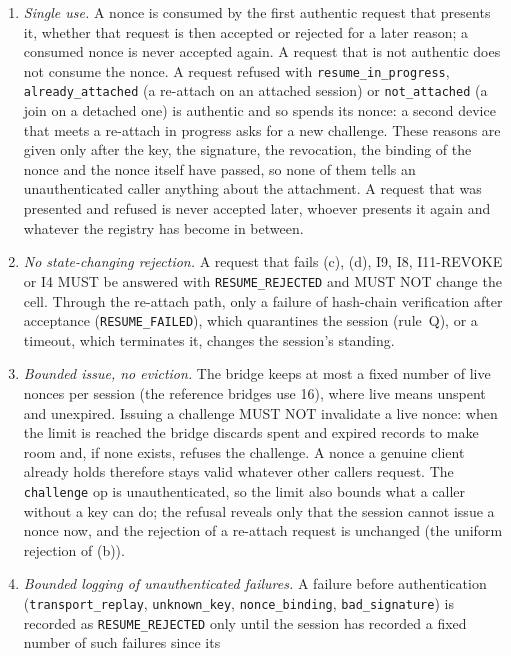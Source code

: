 \begin{invariant}
\begin{enumerate}[leftmargin=2em,label=(\alph*)]
terminated, quarantined, key-exhausted) is named only to a caller whose
signature verified; any other caller is answered \texttt{bad\_signature}.
\item \emph{Single use.} A nonce is consumed by the first authentic
request that presents it, whether that request is then accepted or
rejected for a later reason; a consumed nonce is never accepted again.
A request that is not authentic does not consume the nonce. A request
refused with \texttt{resume\_in\_progress}, \texttt{already\_attached} (a
re-attach on an attached session) or \texttt{not\_attached} (a join on a
detached one) is authentic and so spends its nonce: a second device that
meets a re-attach in progress asks for a new challenge. These reasons are
given only after the key, the signature, the revocation, the binding of the
nonce and the nonce itself have passed, so none of them tells an
unauthenticated caller anything about the attachment. A request that was
presented and refused is never accepted later, whoever presents it again and
whatever the registry has become in between.
\item \emph{No state-changing rejection.} A request that fails (c), (d),
I9, I8, I11-REVOKE or I4 MUST be answered with \texttt{RESUME\_REJECTED} and MUST NOT
change the cell. Through the re-attach path, only a failure of hash-chain
verification after acceptance (\texttt{RESUME\_FAILED}), which quarantines
the session (rule~Q), or a timeout, which terminates it, changes the
session's standing.
\item \emph{Bounded issue, no eviction.} The bridge keeps at most a
fixed number of live nonces per session (the reference bridges use 16), where
live means unspent and unexpired. Issuing a challenge MUST NOT
invalidate a live nonce: when the limit is reached the bridge discards
spent and expired records to make room and, if none exists, refuses the
challenge. A nonce a genuine client already holds therefore stays valid
whatever other callers request. The \texttt{challenge} op is
unauthenticated, so the limit also bounds what a caller without a key can
do; the refusal reveals only that the session cannot issue a nonce now,
and the rejection of a re-attach request is unchanged (the uniform rejection
of (b)).
\item \emph{Bounded logging of unauthenticated failures.} A failure
before authentication (\texttt{transport\_replay}, \texttt{unknown\_key},
\texttt{nonce\_binding}, \texttt{bad\_signature}) is recorded as \texttt{RESUME\_REJECTED} only
until the session has recorded a fixed number of such failures since its

\end{enumerate}
\end{invariant}
